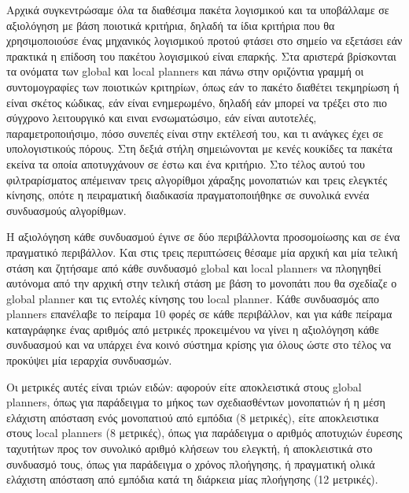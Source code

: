 \documentclass[a4paper,10pt]{article}
\begin{document}
Αρχικά συγκεντρώσαμε όλα τα διαθέσιμα πακέτα λογισμικού και τα υποβάλλαμε σε
αξιολόγηση με βάση ποιοτικά κριτήρια, δηλαδή τα ίδια κριτήρια που θα
χρησιμοποιούσε ένας μηχανικός λογισμικού προτού φτάσει στο σημείο
να εξετάσει εάν πρακτικά η επίδοση του πακέτου λογισμικού είναι επαρκής.
Στα αριστερά βρίσκονται τα ονόματα των global και local
planners και πάνω στην οριζόντια γραμμή οι συντομογραφίες των ποιοτικών
κριτηρίων, όπως εάν το πακέτο διαθέτει τεκμηρίωση ή είναι σκέτος κώδικας, εάν
είναι ενημερωμένο, δηλαδή εάν μπορεί να τρέξει στο πιο σύγχρονο λειτουργικό και
ειναι ενσωματώσιμο, εάν είναι αυτοτελές, παραμετροποιήσιμο, πόσο συνεπές
είναι στην εκτέλεσή του, και τι ανάγκες έχει σε υπολογιστικούς πόρους. Στη
δεξιά στήλη σημειώνονται με κενές κουκίδες τα πακέτα εκείνα τα οποία
αποτυγχάνουν σε έστω και ένα κριτήριο. Στο τέλος αυτού του φιλτραρίσματος
απέμειναν τρεις αλγορίθμοι χάραξης μονοπατιών και τρεις ελεγκτές κίνησης,
οπότε η πειραματική διαδικασία πραγματοποιήθηκε σε συνολικά εννέα συνδυασμούς
αλγορίθμων.

Η αξιολόγηση κάθε συνδυασμού έγινε σε δύο περιβάλλοντα προσομοίωσης και σε ένα
πραγματικό περιβάλλον. Και στις τρεις περιπτώσεις θέσαμε μία αρχική και μία
τελική στάση και ζητήσαμε από κάθε συνδυασμό global και local planners να
πλοηγηθεί αυτόνομα από την αρχική στην τελική στάση με βάση το μονοπάτι που θα
σχεδίαζε ο global planner και τις εντολές κίνησης του local planner. Κάθε
συνδυασμός απο planners επανέλαβε το πείραμα 10 φορές σε κάθε περιβάλλον, και
για κάθε πείραμα καταγράφηκε ένας αριθμός από μετρικές προκειμένου να γίνει η
αξιολόγηση κάθε συνδυασμού και να υπάρχει ένα κοινό σύστημα κρίσης για όλους
ώστε στο τέλος να προκύψει μία ιεραρχία συνδυασμών.

Οι μετρικές αυτές είναι τριών ειδών: αφορούν είτε αποκλειστικά στους global
planners, όπως για παράδειγμα το μήκος των σχεδιασθέντων μονοπατιών ή η μέση
ελάχιστη απόσταση ενός μονοπατιού από εμπόδια (8 μετρικές), είτε αποκλειστικα
στους local planners (8 μετρικές), όπως για παράδειγμα ο αριθμός αποτυχιών
έυρεσης ταχυτήτων προς τον συνολικό αριθμό κλήσεων του ελεγκτή, ή αποκλειστικά
στο συνδυασμό τους, όπως για παράδειγμα ο χρόνος πλοήγησης, ή πραγματική ολικά
ελάχιστη απόσταση από εμπόδια κατά τη διάρκεια μίας πλοήγησης (12 μετρικές).
\end{document}
